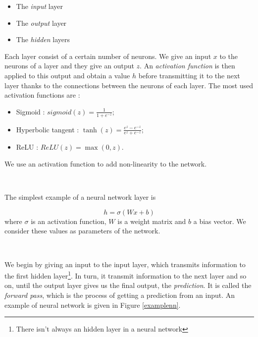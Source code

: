 \documentclass[10pt,a4paper]{article}
\theoremstyle{definition}
\theoremstyle{plain}
\begin{document}
\begin{itemize}
\item The \textit{input} layer
\item The \textit{output} layer
\item The \textit{hidden} layers
\end{itemize}

Each layer consist of a certain number of neurons. We give an input $x$ to the neurons of a layer and they give an output $z$. An \textit{activation function} is then applied to this output and obtain a value $h$ before transmitting it to the next layer thanks to the connections between the neurons of each layer. The most used activation functions are :
\begin{itemize}
\item Sigmoid : $sigmoid(z) = \frac{1}{1 + e^{-z}}$;
\item Hyperbolic tangent : $\tanh(z) = \frac{e^z - e^{-z}}{e^z + e^{-z}}$;
\item ReLU : $ReLU(z) = \max(0,z)$.
\end{itemize}
We use an activation function to add non-linearity to the network.

~

The simplest example of a neural network layer is 

$$
h = \sigma (Wx +b)
$$
where $\sigma$ is an activation function, $W$ is a weight matrix and $b$ a bias vector. We consider these values as parameters of the network.

~

We begin by giving an input to the input layer, which transmits information to the first hidden layer\footnote{There isn't always an hidden layer in a neural network}. In turn, it transmit information to the next layer and so on, until the output layer gives us the final output, the \textit{prediction}. It is called the \textit{forward pass}, which is the process of getting a prediction from an input. An example of neural network is given in Figure \ref{examplenn}. 
\end{document}
